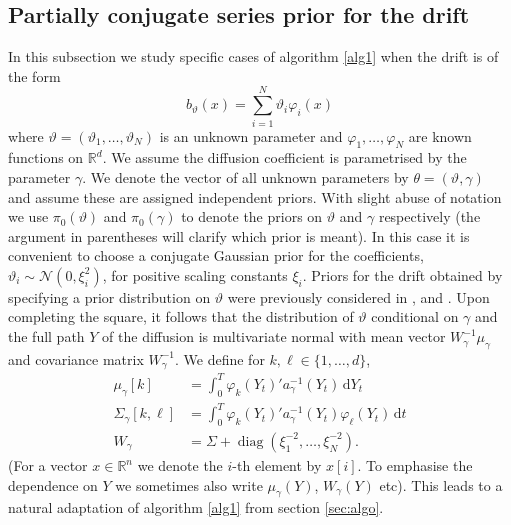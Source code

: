 \documentclass[preprint]{imsart}
\renewcommand{\th}{\theta}
\newcommand{\ga}{\gamma}
\renewcommand{\phi}{\varphi}
\newcommand{\scr}[1]{{\mathcal #1}}
\newcommand{\RR}{\mathbb{R}}
\providecommand{\diag}[0]{{\operatorname{diag}}}
\theoremstyle{definition}
\newcommand{\dd}{{\,\mathrm d}}
\begin{document}
\subsection{Partially conjugate series prior for the drift}\label{subsec:conj}
In this subsection we study specific cases of algorithm \ref{alg1}  when the drift is of the form
\begin{equation}\label{sumprior}
b_{\vartheta}(x) = \sum_{i=1}^N \vartheta_i \phi_i(x)
\end{equation}
where $\vartheta=(\vartheta_1, \ldots,\vartheta_N)$ is an unknown  parameter and $\phi_1,\ldots, \phi_N$ are known  functions on $\RR^d$. We assume the diffusion coefficient  is parametrised by the parameter $\ga$. We denote the vector of all unknown parameters by $\th=(\vartheta, \gamma)$ and assume these are assigned independent priors. With slight abuse of notation we use $\pi_0(\vartheta)$ and $\pi_0(\gamma)$ to denote the priors on   $\vartheta$ and $\gamma$ respectively (the argument in parentheses will clarify which prior is meant). In this case it is convenient to choose a conjugate Gaussian prior for the coefficients, $\vartheta_i \sim \scr N(0, \xi^2_i)$, 
for positive scaling constants $\xi_i$. Priors for the drift obtained by specifying a prior distribution on $\vartheta$ were previously considered in \cite{Kuchler-Sorensen}, \cite{Bladt} and \cite{vdMeulen}. Upon completing the square, it follows that  the distribution of $\vartheta$ conditional on $\gamma$ and the full path $Y$ of the diffusion  is multivariate normal with mean vector $W_\ga^{-1} \mu_\ga$ and covariance matrix $W_\ga^{-1}$. 
We define for $k, \ell \in \{1,\ldots, d\}$,
\begin{align*} \mu_\ga[k] &= \int_0^T \phi_k(Y_t)'a_\gamma^{-1}(Y_t)\dd Y_t \\ 
\Sigma_{\ga}[k,\ell] & = \int_0^T \phi_k(Y_t)' a_\gamma^{-1}(Y_t) \phi_\ell(Y_t) \dd t \\
W_\ga &=\Sigma + \diag(\xi_1^{-2},\ldots, \xi_N^{-2}).
\end{align*}
(For a vector $x\in \RR^n$ we denote the $i$-th element by $x[i]$. To emphasise the dependence on $Y$ we sometimes also write $\mu_\gamma(Y)$, $W_\gamma(Y)$ etc).
This leads to a natural adaptation of algorithm \ref{alg1} from section \ref{sec:algo}. 
\end{document}
